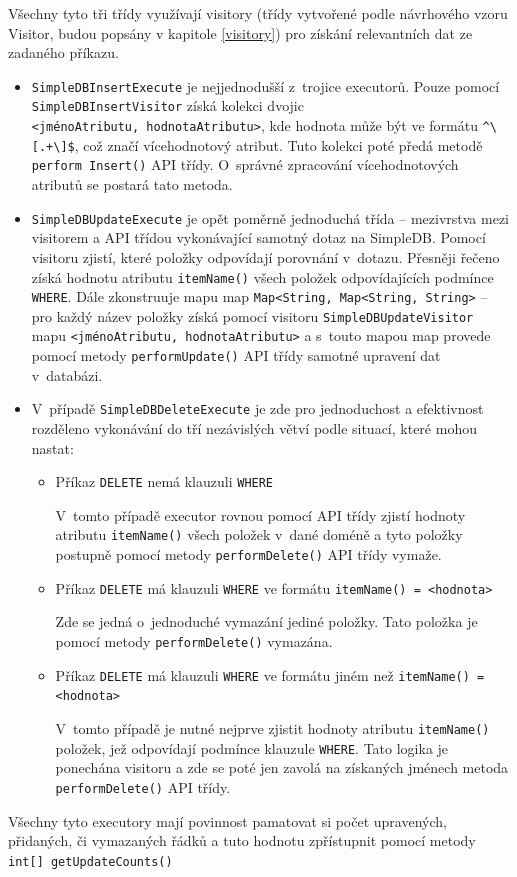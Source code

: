 \documentclass[oneside,12pt]{fithesis2}
\begin{document}
Všechny tyto tři třídy využívají visitory (třídy vytvořené podle návrhového vzoru Visitor, budou popsány v kapitole \ref{visitory}) pro získání relevantních dat ze zadaného příkazu. 
\begin{itemize}
\item \texttt{SimpleDBInsertExecute} je nejjednodušší z~trojice executorů. Pouze pomocí \texttt{SimpleDBInsertVisitor} získá kolekci dvojic\\ \texttt{<jménoAtributu, hodnota\allowbreak Atributu>}, kde hodnota může být ve formátu \verb|^\[.+\]$|, což značí vícehodnotový atribut. Tuto kolekci poté předá metodě \texttt{perform Insert()} API třídy. O~správné zpracování vícehodnotových atributů se postará tato metoda.

\item \texttt{SimpleDBUpdateExecute} je opět poměrně jednoduchá třída -- mezivrstva mezi visitorem a API třídou vykonávající samotný dotaz na SimpleDB. Pomocí visitoru zjistí, které položky odpovídají porovnání v~dotazu. Přesněji řečeno získá hodnotu atributu \texttt{itemName()} všech položek odpovídajících podmínce \texttt{WHERE}. Dále zkonstruuje mapu map \texttt{Map<String, Map<String, String>} -- pro každý název položky získá pomocí visitoru \texttt{SimpleDBUpdate\allowbreak Visitor} mapu \texttt{<jménoAtributu, hodnotaAtributu>} a s~touto mapou map provede pomocí metody \texttt{performUpdate()} API třídy samotné upravení dat v~databázi.

\item V~případě \texttt{SimpleDBDeleteExecute} je zde pro jednoduchost a efektivnost rozděleno vykonávání do tří nezávislých větví podle situací, které mohou nastat:
\begin{itemize}
 \item Příkaz \texttt{DELETE} nemá klauzuli \texttt{WHERE}
 
  V~tomto případě executor rovnou pomocí API třídy zjistí hodnoty atributu \texttt{itemName()} všech položek v~dané doméně a tyto položky postupně pomocí metody \texttt{performDelete()} API třídy vymaže.
  
  \item Příkaz \texttt{DELETE} má klauzuli \texttt{WHERE} ve formátu \texttt{itemName() = <hodnota>}
  
  Zde se jedná o~jednoduché vymazání jediné položky. Tato položka je pomocí metody \texttt{performDelete()} vymazána.
  
\item Příkaz \texttt{DELETE} má klauzuli \texttt{WHERE} ve formátu jiném než \texttt{itemName() = <hodnota>}
  
  V~tomto případě je nutné nejprve zjistit hodnoty atributu \texttt{itemName()} položek, jež odpovídají podmínce klauzule \texttt{WHERE}. Tato logika je ponechána visitoru a zde se poté jen zavolá na získaných jménech metoda \texttt{performDelete()} API třídy.
\end{itemize}
\end{itemize}
Všechny tyto executory mají povinnost pamatovat si počet upravených, přidaných, či vymazaných řádků a tuto hodnotu zpřístupnit pomocí metody \texttt{int[] getUpdateCounts()}
\end{document}
